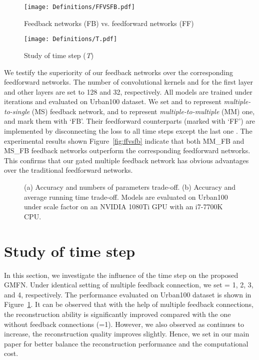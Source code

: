 \documentclass{bmvc2k}
\begin{document}
\begin{figure}[htbp]
	\begin{minipage}[t]{0.5\linewidth}
		\centering
		\texttt{[image: Definitions/FFVSFB.pdf]}
		\caption{Feedback networks (FB) vs. feedforward networks (FF)}
		\label{fig:ffvsfb}
	\end{minipage}\begin{minipage}[t]{0.5\linewidth}
		\centering
		\texttt{[image: Definitions/T.pdf]}
		\caption{Study of time step (\textit{T})}
		\label{fig:st}
	\end{minipage}
\end{figure}


 We testify the superiority of our feedback networks over the corresponding feedforward networks. The number of convolutional kernels  and  for the first layer and other layers are set to 128 and 32, respectively. All models are trained under  iterations and evaluated on Urban100 dataset. We set  and  to represent \textit{multiple-to-single} (MS) feedback network,  and  to represent \textit{multiple-to-multiple} (MM) one, and mark them with `FB'. Their feedforward counterparts (marked with `FF') are implemented by disconnecting the loss to all time steps except the last one \cite{zamir2017feedback, li2019srfbn}. The experimental results shown Figure~\ref{fig:ffvsfb} indicate that both MM\_FB and MS\_FB feedback networks outperform the corresponding feedforward networks. This confirms that our gated multiple feedback network has obvious advantages over the traditional feedforward networks. 

\begin{figure}
	\centering
	\caption{(a) Accuracy and numbers of parameters trade-off. (b) Accuracy and average running time trade-off. Models are evaluated on Urban100 under scale factor  on an NVIDIA 1080Ti GPU with an i7-7700K CPU.}
	\label{fig:ma}
\end{figure}

\section{Study of time step}
\label{sec:sot}

In this section, we investigate the influence of the time step  on the proposed GMFN. Under identical setting of multiple feedback connection, we set  = 1, 2, 3, and 4, respectively. The performance evaluated on Urban100 dataset is shown in Figure~\ref{fig:st}. It can be observed that with the help of multiple feedback connections, the reconstruction ability is significantly improved compared with the one without feedback connections (=1). However, we also observed as  continues to increase, the reconstruction quality improves slightly. Hence, we set  in our main paper for better balance the reconstruction performance and the computational cost. 
\end{document}
